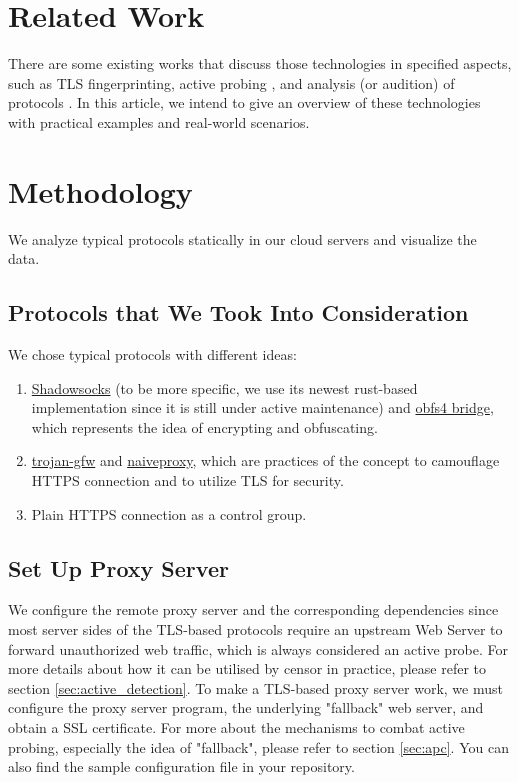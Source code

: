 \documentclass[conference]{IEEEtran}
\begin{document}
\section{Related Work}
There are some existing works that discuss those technologies in specified aspects, such as TLS fingerprinting\cite{TLS_Fingerprinting}, active probing \cite{Active_Probing}, and analysis (or audition) of protocols \cite{shadowsocks_analysis} \cite{Trojan-Probe}. In this article, we intend to give an overview of these technologies with practical examples and real-world scenarios.

\section{Methodology}
We analyze typical protocols statically in our cloud servers and visualize the data.

\subsection{Protocols that We Took Into Consideration}
We chose typical protocols with different ideas:
\begin{enumerate}
    \item \href{https://shadowsocks.org}{Shadowsocks} (to be more specific, we use its newest rust-based implementation since it is still under active maintenance) and \href{https://gitlab.com/yawning/obfs4}{obfs4 bridge}, which represents the idea of encrypting and obfuscating.
    \item \href{https://trojan-gfw.github.io/trojan/}{trojan-gfw} and \href{https://github.com/klzgrad/naiveproxy}{naiveproxy}, which are practices of the concept to camouflage HTTPS connection and to utilize TLS for security.
    \item Plain HTTPS connection as a control group.
\end{enumerate}

\subsection{Set Up Proxy Server}
We configure the remote proxy server and the corresponding dependencies since most server sides of the TLS-based protocols require an upstream Web Server to forward unauthorized web traffic, which is always considered an active probe. For more details about how it can be utilised by censor in practice, please refer to section \ref{sec:active_detection}.
To make a TLS-based proxy server work, we must configure the proxy server program, the underlying "fallback" web server, and obtain a SSL certificate. For more about the mechanisms to combat active probing, especially the idea of "fallback", please refer to section \ref{sec:apc}. You can also find the sample configuration file in your repository. %
\end{document}
